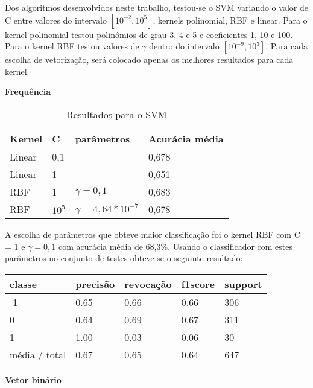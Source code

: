 Dos algoritmos desenvolvidos neste trabalho, testou-se o SVM variando o valor de C entre valores
do intervalo $[10^{-2}, 10^5]$, kernels polinomial, RBF e linear. Para o kernel polinomial testou
polinômios de grau 3, 4 e 5 e coeficientes 1, 10 e 100. Para o kernel RBF testou valores de $\gamma$
dentro do intervalo $[10^{-9}, 10^3]$. Para cada escolha de vetorização, será colocado apenas os
melhores resultados para cada kernel.

\textbf{Frequência}

\begin{table}[H]
	\centering
	\caption{Resultados para o SVM}
	\begin{tabular}{l l l l}
		\hline
		Kernel & C & parâmetros & Acurácia média \\
		\hline
		Linear & 0,1 & & 0,678 \\
		\hline
		Linear & 1 & & 0,651 \\
		\hline
		RBF & 1 & $\gamma = 0,1$ & 0,683 \\
		\hline
		RBF & $10^5$ & $\gamma = 4,64*10^{-7}$ & 0,678 \\
		\hline
	\end{tabular}
\end{table}

A escolha de parâmetros que obteve maior classificação foi o kernel RBF com C = 1 e $\gamma = 0,1$
com acurácia média de 68,3\%. Usando o classificador com estes parâmetros no conjunto de testes
obteve-se o seguinte resultado:

\begin{table}[H]
	\centering
	\begin{tabular}{l | l | l | l | l}
		\hline
		classe  	&	precisão  &  revocação &  f1\-score &  support \\
		\hline
         -1   &    0.65  &    0.66   &   0.66   &    306 \\
         \hline
          0   &    0.64   &   0.69   &   0.67    &   311 \\
          \hline
          1   &    1.00   &   0.03   &   0.06    &    30 \\
		\hline
		média / total   &    0.67   &   0.65   &   0.64   &    647 \\
		\hline
	\end{tabular}
\end{table}

\textbf{Vetor binário}

